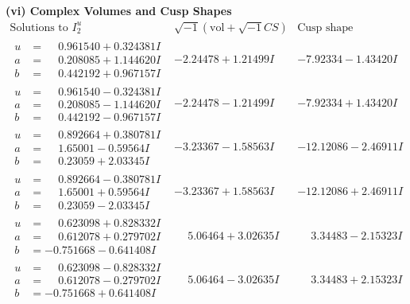 \documentclass[1p]{elsarticle_modified}
\theoremstyle{definition}
\newcommand{\I}{\sqrt{-1}}
\begin{document}
\newpage\flushleft \textbf{(vi) Complex Volumes and Cusp Shapes}
$$\begin{array}{c|c|c}  
\text{Solutions to }I^u_{2}& \I (\text{vol} + \sqrt{-1}CS) & \text{Cusp shape}\\
 \hline 
\begin{aligned}
u &= \phantom{-}0.961540 + 0.324381 I \\
a &= \phantom{-}0.208085 + 1.144620 I \\
b &= \phantom{-}0.442192 + 0.967157 I\end{aligned}
 & -2.24478 + 1.21499 I & -7.92334 - 1.43420 I \\ \hline\begin{aligned}
u &= \phantom{-}0.961540 - 0.324381 I \\
a &= \phantom{-}0.208085 - 1.144620 I \\
b &= \phantom{-}0.442192 - 0.967157 I\end{aligned}
 & -2.24478 - 1.21499 I & -7.92334 + 1.43420 I \\ \hline\begin{aligned}
u &= \phantom{-}0.892664 + 0.380781 I \\
a &= \phantom{-}1.65001 - 0.59564 I \\
b &= \phantom{-}0.23059 + 2.03345 I\end{aligned}
 & -3.23367 - 1.58563 I & -12.12086 - 2.46911 I \\ \hline\begin{aligned}
u &= \phantom{-}0.892664 - 0.380781 I \\
a &= \phantom{-}1.65001 + 0.59564 I \\
b &= \phantom{-}0.23059 - 2.03345 I\end{aligned}
 & -3.23367 + 1.58563 I & -12.12086 + 2.46911 I \\ \hline\begin{aligned}
u &= \phantom{-}0.623098 + 0.828332 I \\
a &= \phantom{-}0.612078 + 0.279702 I \\
b &= -0.751668 - 0.641408 I\end{aligned}
 & \phantom{-}5.06464 + 3.02635 I & \phantom{-}3.34483 - 2.15323 I \\ \hline\begin{aligned}
u &= \phantom{-}0.623098 - 0.828332 I \\
a &= \phantom{-}0.612078 - 0.279702 I \\
b &= -0.751668 + 0.641408 I\end{aligned}
 & \phantom{-}5.06464 - 3.02635 I & \phantom{-}3.34483 + 2.15323 I \\ \hline\begin{aligned}

\end{aligned}
\end{array}$$
\end{document}
